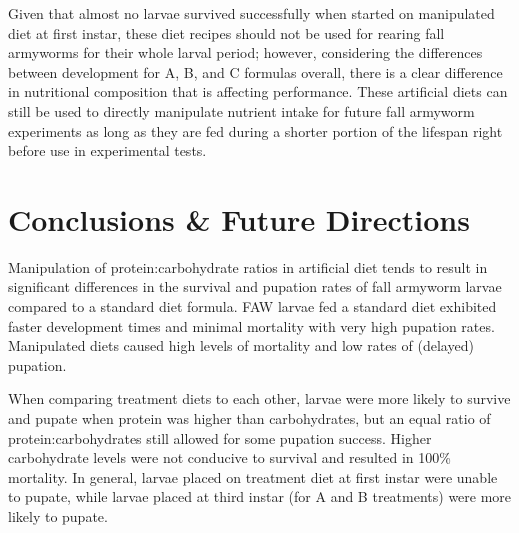 \documentclass[12pt,]{article}
\begin{document}
Given that almost no larvae survived successfully when started on
manipulated diet at first instar, these diet recipes should not be used
for rearing fall armyworms for their whole larval period; however,
considering the differences between development for A, B, and C formulas
overall, there is a clear difference in nutritional composition that is
affecting performance. These artificial diets can still be used to
directly manipulate nutrient intake for future fall armyworm experiments
as long as they are fed during a shorter portion of the lifespan right
before use in experimental tests.

\hypertarget{conclusions-future-directions}{%
\section{Conclusions \& Future
Directions}\label{conclusions-future-directions}}

Manipulation of protein:carbohydrate ratios in artificial diet tends to
result in significant differences in the survival and pupation rates of
fall armyworm larvae compared to a standard diet formula. FAW larvae fed
a standard diet exhibited faster development times and minimal mortality
with very high pupation rates. Manipulated diets caused high levels of
mortality and low rates of (delayed) pupation.

When comparing treatment diets to each other, larvae were more likely to
survive and pupate when protein was higher than carbohydrates, but an
equal ratio of protein:carbohydrates still allowed for some pupation
success. Higher carbohydrate levels were not conducive to survival and
resulted in 100\% mortality. In general, larvae placed on treatment diet
at first instar were unable to pupate, while larvae placed at third
instar (for A and B treatments) were more likely to pupate.
\end{document}
